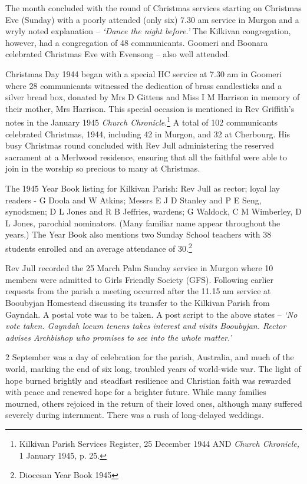 The month concluded with the round of Christmas services starting on Christmas Eve (Sunday) with a poorly attended (only six) 7.30 am service in Murgon and a wryly noted explanation -- \emph{`Dance the night before.'} The Kilkivan congregation, however, had a congregation of 48 communicants. Goomeri and Boonara celebrated Christmas Eve with Evensong -- also well attended.



Christmas Day 1944 began with a special HC service at 7.30 am in Goomeri where 28 communicants witnessed the dedication of brass candlesticks and a silver bread box, donated by Mrs D Gittens and Miss I M Harrison in memory of their mother, Mrs Harrison. This special occasion is mentioned in Rev Griffith's notes in the January 1945 \emph{Church Chronicle}.\footnote{Kilkivan Parish Services Register, 25 December 1944 AND \emph{Church Chronicle,} 1 January 1945, p. 25.} A total of 102 communicants celebrated Christmas, 1944, including 42 in Murgon, and 32 at Cherbourg. His busy Christmas round concluded with Rev Jull administering the reserved sacrament at a Merlwood residence, ensuring that all the faithful were able to join in the worship so precious to many at Christmas.


The 1945 Year Book listing for Kilkivan Parish: Rev Jull as rector; loyal lay readers - G Doola and W Atkins; Messrs E J D Stanley and P E Seng, synodsmen; D L Jones and R B Jeffries, wardens; G Waldock, C M Wimberley, D L Jones, parochial nominators. (Many familiar name appear throughout the years.) The Year Book also mentions two Sunday School teachers with 38 students enrolled and an average attendance of 30.\footnote{Diocesan Year Book 1945}


Rev Jull recorded the 25 March Palm Sunday service in Murgon where 10 members were admitted to Girls Friendly Society (GFS). Following earlier requests from the parish a meeting occurred after the 11.15 am service at Booubyjan Homestead discussing its transfer to the Kilkivan Parish from Gayndah. A postal vote was to be taken. A post script to the above states -- \emph{`No vote taken. Gayndah locum tenens takes interest and visits Booubyjan. Rector advises Archbishop who promises to see into the whole matter.'}



2 September was a day of celebration for the parish, Australia, and much of the world, marking the end of six long, troubled years of world-wide war. The light of hope burned brightly and steadfast resilience and Christian faith was rewarded with peace and renewed hope for a brighter future. While many families mourned, others rejoiced in the return of their loved ones, although many suffered severely during internment. There was a rush of long-delayed weddings.









